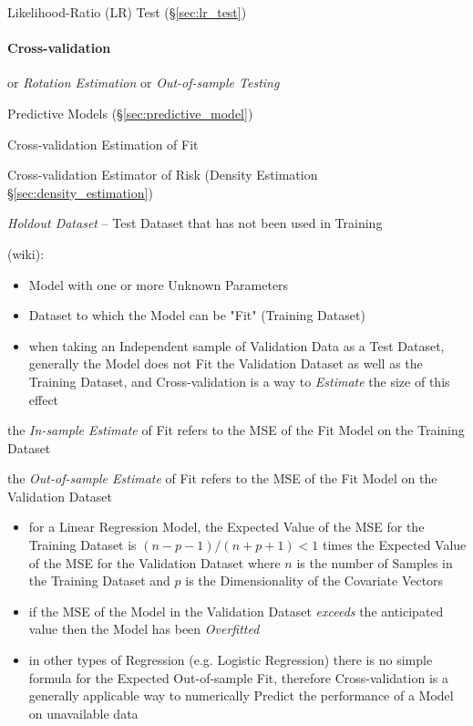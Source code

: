 Likelihood-Ratio (LR) Test (\S\ref{sec:lr_test})



\paragraph{Cross-validation}\label{sec:cross_validation}\hfill

or \emph{Rotation Estimation} or \emph{Out-of-sample Testing}

Predictive Models (\S\ref{sec:predictive_model})

Cross-validation Estimation of Fit

Cross-validation Estimator of Risk (Density Estimation
\S\ref{sec:density_estimation})

\emph{Holdout Dataset} -- Test Dataset that has not been used in Training

(wiki):

\begin{itemize}
  \item Model with one or more Unknown Parameters
  \item Dataset to which the Model can be "Fit" (Training Dataset)
  \item when taking an Independent sample of Validation Data as a Test Dataset,
    generally the Model does not Fit the Validation Dataset as well as the
    Training Dataset, and Cross-validation is a way to \emph{Estimate} the size
    of this effect
\end{itemize}

the \emph{In-sample Estimate} of Fit refers to the MSE of the Fit Model on the
Training Dataset

the \emph{Out-of-sample Estimate} of Fit refers to the MSE of the Fit Model on
the Validation Dataset

\begin{itemize}
  \item for a Linear Regression Model, the Expected Value of the MSE for the
    Training Dataset is $(n - p - 1) / (n + p + 1) < 1$ times the Expected Value
    of the MSE for the Validation Dataset where $n$ is the number of Samples in
    the Training Dataset and $p$ is the Dimensionality of the Covariate Vectors
  \item if the MSE of the Model in the Validation Dataset \emph{exceeds} the
    anticipated value then the Model has been \emph{Overfitted}
  \item in other types of Regression (e.g. Logistic Regression) there is no
    simple formula for the Expected Out-of-sample Fit, therefore
    Cross-validation is a generally applicable way to numerically Predict the
    performance of a Model on unavailable data
\end{itemize}

